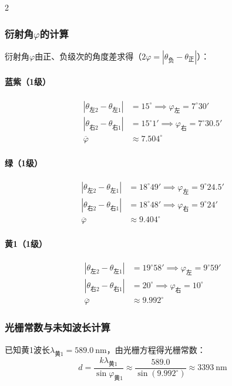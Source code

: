 \documentclass[12pt,a4paper]{article}
\begin{document}
\begin{multicols}{2}
    \subsubsection{衍射角$\boxed{\varphi}$的计算}
    衍射角$\varphi$由正、负级次的角度差求得（$2\varphi = |\theta_{\text{负}} - \theta_{\text{正}}|$）：

    \paragraph{蓝紫（1级）}
    \[
    \begin{aligned}
    |\theta_{\text{左}2} - \theta_{\text{左}1}| &= 15^\circ \implies \varphi_{\text{左}} = 7^\circ30' \\
    |\theta_{\text{右}2} - \theta_{\text{右}1}| &= 15^\circ1' \implies \varphi_{\text{右}} = 7^\circ30.5' \\
    \overline{\varphi} &\approx 7.504^\circ
    \end{aligned}
    \]

    \paragraph{绿（1级）}
    \[
    \begin{aligned}
    |\theta_{\text{左}2} - \theta_{\text{左}1}| &= 18^\circ49' \implies \varphi_{\text{左}} = 9^\circ24.5' \\
    |\theta_{\text{右}2} - \theta_{\text{右}1}| &= 18^\circ48' \implies \varphi_{\text{右}} = 9^\circ24' \\
    \overline{\varphi} &\approx 9.404^\circ
    \end{aligned}
    \]

    \paragraph{黄1（1级）}
    \[
    \begin{aligned}
    |\theta_{\text{左}2} - \theta_{\text{左}1}| &= 19^\circ58' \implies \varphi_{\text{左}} = 9^\circ59' \\
    |\theta_{\text{右}2} - \theta_{\text{右}1}| &= 20^\circ \implies \varphi_{\text{右}} = 10^\circ \\
    \overline{\varphi} &\approx 9.992^\circ
    \end{aligned}
    \]


    \subsubsection{光栅常数与未知波长计算}
    已知黄1波长$\lambda_{\text{黄1}}=589.0\ \text{nm}$，由光栅方程得光栅常数：
    \[
    d = \frac{k\lambda_{\text{黄1}}}{\sin\varphi_{\text{黄1}}} \approx \frac{589.0}{\sin(9.992^\circ)} \approx 3393\ \text{nm}
    \]


\end{multicols}
\end{document}
